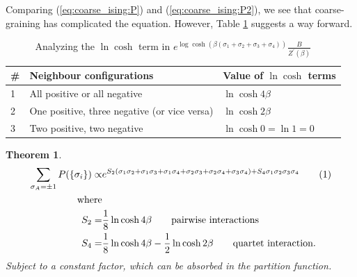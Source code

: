 \documentclass[]{article}
\newcommand\numberthis{\addtocounter{equation}{1}\tag{\theequation}}
\newtheorem{thm}{Theorem}
\begin{document}
Comparing (\ref{eq:coarse_ising:P}) and (\ref{eq:coarse_ising:P2}), we see that coarse-graining has complicated the equation. However, Table \ref{table:ising-cosh} suggests a way forward.

\begin{table}[H]
	\begin{center}
		\caption[Analyzing the $\ln \cosh$ term]{Analyzing the $\ln \cosh$ term in $ e^{\log{\cosh({\beta(\sigma_1+\sigma_2+\sigma_3+\sigma_4)})}} \frac{B}{Z^\prime(\beta)}$}\label{table:ising-cosh}
		\begin{tabular}{|l|l|l|}\hline
			\#&Neighbour configurations&Value of $\ln \cosh$ terms\\\hline
			1&All positive or all negative&$\ln \cosh 4\beta$\\\hline
			2&One positive, three negative (or vice versa)&$\ln \cosh 2\beta$\\\hline
			3&Two positive, two negative&$\ln \cosh 0 = \ln 1 = 0$\\\hline
		\end{tabular}
	\end{center}
\end{table}

\begin{thm}
	\begin{align*}
		\sum_{\sigma_A=\pm 1} P(\{\sigma_i\}) \propto&e^{S_2 (\sigma_1\sigma_2 + \sigma_1\sigma_3+ \sigma_1\sigma_4 + \sigma_2 \sigma_3 + \sigma_2 \sigma_4 +\sigma_3 \sigma_4) + S_4 \sigma_1 \sigma_2 \sigma_3 \sigma_4} \numberthis \label{eq:coupled:sigmas}\\
		 \text{where}\\
		S_2 =& \frac{1}{8} \ln{\cosh{4\beta}} \tag*{pairwise interactions}\\
		S_4 =& \frac{1}{8} \ln{\cosh{4\beta}} - \frac{1}{2} \ln{\cosh{2\beta}} \tag*{quartet interaction.}
	\end{align*}
		Subject to a constant factor, which can be absorbed in the partition function.
\end{thm}
\end{document}
